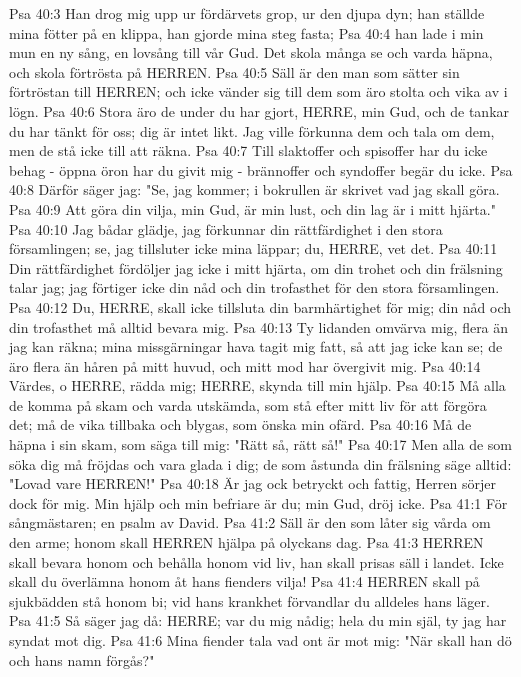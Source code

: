 Psa 40:3  Han drog mig upp ur fördärvets grop, ur den djupa dyn; han ställde mina fötter på en klippa, han gjorde mina steg fasta;
Psa 40:4  han lade i min mun en ny sång, en lovsång till vår Gud. Det skola många se och varda häpna, och skola förtrösta på HERREN.
Psa 40:5  Säll är den man som sätter sin förtröstan till HERREN; och icke vänder sig till dem som äro stolta och vika av i lögn.
Psa 40:6  Stora äro de under du har gjort, HERRE, min Gud, och de tankar du har tänkt för oss; dig är intet likt. Jag ville förkunna dem och tala om dem, men de stå icke till att räkna.
Psa 40:7  Till slaktoffer och spisoffer har du icke behag - öppna öron har du givit mig - brännoffer och syndoffer begär du icke.
Psa 40:8  Därför säger jag: "Se, jag kommer; i bokrullen är skrivet vad jag skall göra.
Psa 40:9  Att göra din vilja, min Gud, är min lust, och din lag är i mitt hjärta."
Psa 40:10  Jag bådar glädje, jag förkunnar din rättfärdighet i den stora församlingen; se, jag tillsluter icke mina läppar; du, HERRE, vet det.
Psa 40:11  Din rättfärdighet fördöljer jag icke i mitt hjärta, om din trohet och din frälsning talar jag; jag förtiger icke din nåd och din trofasthet för den stora församlingen.
Psa 40:12  Du, HERRE, skall icke tillsluta din barmhärtighet för mig; din nåd och din trofasthet må alltid bevara mig.
Psa 40:13  Ty lidanden omvärva mig, flera än jag kan räkna; mina missgärningar hava tagit mig fatt, så att jag icke kan se; de äro flera än håren på mitt huvud, och mitt mod har övergivit mig.
Psa 40:14  Värdes, o HERRE, rädda mig; HERRE, skynda till min hjälp.
Psa 40:15  Må alla de komma på skam och varda utskämda, som stå efter mitt liv för att förgöra det; må de vika tillbaka och blygas, som önska min ofärd.
Psa 40:16  Må de häpna i sin skam, som säga till mig: "Rätt så, rätt så!"
Psa 40:17  Men alla de som söka dig må fröjdas och vara glada i dig; de som åstunda din frälsning säge alltid: "Lovad vare HERREN!"
Psa 40:18  Är jag ock betryckt och fattig, Herren sörjer dock för mig. Min hjälp och min befriare är du; min Gud, dröj icke.
Psa 41:1  För sångmästaren; en psalm av David.
Psa 41:2  Säll är den som låter sig vårda om den arme; honom skall HERREN hjälpa på olyckans dag.
Psa 41:3  HERREN skall bevara honom och behålla honom vid liv, han skall prisas säll i landet. Icke skall du överlämna honom åt hans fienders vilja!
Psa 41:4  HERREN skall på sjukbädden stå honom bi; vid hans krankhet förvandlar du alldeles hans läger.
Psa 41:5  Så säger jag då: HERRE; var du mig nådig; hela du min själ, ty jag har syndat mot dig.
Psa 41:6  Mina fiender tala vad ont är mot mig: "När skall han dö och hans namn förgås?"
